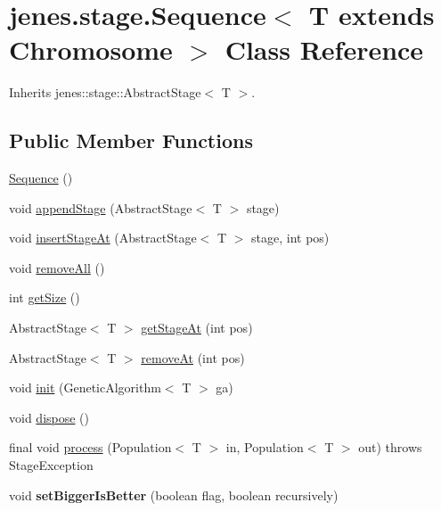 \hypertarget{classjenes_1_1stage_1_1_sequence_3_01_t_01extends_01_chromosome_01_4}{
\section{jenes.stage.Sequence$<$ T extends Chromosome $>$ Class Reference}
\label{classjenes_1_1stage_1_1_sequence_3_01_t_01extends_01_chromosome_01_4}
}
Inherits jenes::stage::AbstractStage$<$ T $>$.

\subsection*{Public Member Functions}
\begin{CompactItemize}
\item 
\hyperlink{classjenes_1_1stage_1_1_sequence_3_01_t_01extends_01_chromosome_01_4_f6554137f4a770513d9cc8bf481e7d00}{Sequence} ()
\item 
void \hyperlink{classjenes_1_1stage_1_1_sequence_3_01_t_01extends_01_chromosome_01_4_7d0e59aeed366cb6f71f754f61bfceb3}{appendStage} (AbstractStage$<$ T $>$ stage)
\item 
void \hyperlink{classjenes_1_1stage_1_1_sequence_3_01_t_01extends_01_chromosome_01_4_922e6363fc19620738e95ddfc649ea6e}{insertStageAt} (AbstractStage$<$ T $>$ stage, int pos)
\item 
void \hyperlink{classjenes_1_1stage_1_1_sequence_3_01_t_01extends_01_chromosome_01_4_b020311ac8fad8d6d884df9634c211b8}{removeAll} ()
\item 
int \hyperlink{classjenes_1_1stage_1_1_sequence_3_01_t_01extends_01_chromosome_01_4_f16f419e9be758779fa14cf53f31bfe1}{getSize} ()
\item 
AbstractStage$<$ T $>$ \hyperlink{classjenes_1_1stage_1_1_sequence_3_01_t_01extends_01_chromosome_01_4_a9e1d97737fed4c5141cda315c216b32}{getStageAt} (int pos)
\item 
AbstractStage$<$ T $>$ \hyperlink{classjenes_1_1stage_1_1_sequence_3_01_t_01extends_01_chromosome_01_4_1336b162d37aaa9b402c49480d12f8ef}{removeAt} (int pos)
\item 
void \hyperlink{classjenes_1_1stage_1_1_sequence_3_01_t_01extends_01_chromosome_01_4_98d9ad6e0fdc1547971fe7fce029e25f}{init} (GeneticAlgorithm$<$ T $>$ ga)
\item 
void \hyperlink{classjenes_1_1stage_1_1_sequence_3_01_t_01extends_01_chromosome_01_4_4faf3479fa76eef530633ce8339971e5}{dispose} ()
\item 
final void \hyperlink{classjenes_1_1stage_1_1_sequence_3_01_t_01extends_01_chromosome_01_4_dc0e7397edd44839ef221122db3696e8}{process} (Population$<$ T $>$ in, Population$<$ T $>$ out)  throws StageException 
\item 
\hypertarget{classjenes_1_1stage_1_1_sequence_3_01_t_01extends_01_chromosome_01_4_759a03c3336352cc390b2024afcc2ab1}{
void \textbf{setBiggerIsBetter} (boolean flag, boolean recursively)}
\label{classjenes_1_1stage_1_1_sequence_3_01_t_01extends_01_chromosome_01_4_759a03c3336352cc390b2024afcc2ab1}


\end{CompactItemize}

